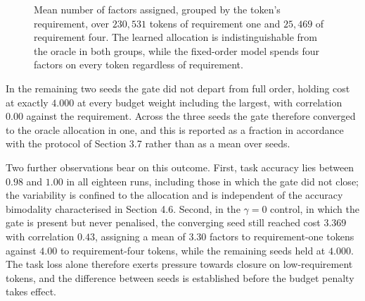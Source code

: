 \begin{figure}[ht]
	\centering
	\caption{Mean number of factors assigned, grouped by the token's requirement, over $230{,}531$ tokens of requirement one and $25{,}469$ of requirement four. The learned allocation is indistinguishable from the oracle in both groups, while the fixed-order model spends four factors on every token regardless of requirement.}
	\label{fig:alloc}
\end{figure}

In the remaining two seeds the gate did not depart from full order, holding cost
at exactly $4.000$ at every budget weight including the largest, with correlation
$0.00$ against the requirement. Across the three seeds the gate therefore
converged to the oracle allocation in one, and this is reported as a fraction in
accordance with the protocol of Section 3.7 rather than as a mean over seeds.

Two further observations bear on this outcome. First, task accuracy lies between
$0.98$ and $1.00$ in all eighteen runs, including those in which the gate did not
close; the variability is confined to the allocation and is independent of the
accuracy bimodality characterised in Section 4.6. Second, in the $\gamma = 0$
control, in which the gate is present but never penalised, the converging seed
still reached cost $3.369$ with correlation $0.43$, assigning a mean of $3.30$
factors to requirement-one tokens against $4.00$ to requirement-four tokens,
while the remaining seeds held at $4.000$. The task loss alone therefore exerts
pressure towards closure on low-requirement tokens, and the difference between
seeds is established before the budget penalty takes effect.

